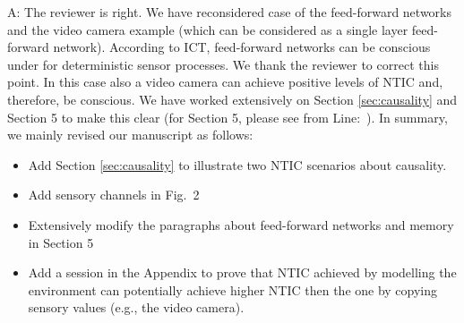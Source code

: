 \documentclass[utf8]{article}
\newenvironment{ans}  
    {\color{Black}\noindent A:}
    {~\newline}
\begin{document}
        \begin{ans}
        	The reviewer is right. We have reconsidered case of the feed-forward networks and the video camera example (which can be considered as a single layer feed-forward network). According to ICT, feed-forward networks can be conscious under for deterministic sensor processes. We thank the reviewer to correct this point. In this case also a video camera can achieve positive levels of NTIC and, therefore, be conscious. We have worked extensively on Section \ref{sec:causality} and Section 5 to make this clear (for Section 5, please see from Line:~).
        	In summary, we mainly revised our manuscript as follows:
        	\begin{itemize}
        	    \item Add Section \ref{sec:causality} to illustrate two NTIC scenarios about causality. 
        	    \item Add sensory channels in Fig.~2
        	    \item Extensively modify the paragraphs about feed-forward networks and memory in Section 5
        	    \item Add a session in the Appendix to prove that NTIC achieved by modelling the environment can potentially achieve higher NTIC then the one by copying sensory values (e.g., the video camera).
        	\end{itemize}
        	
        	
        	
        	
		    
		    

\end{ans}
\end{document}
